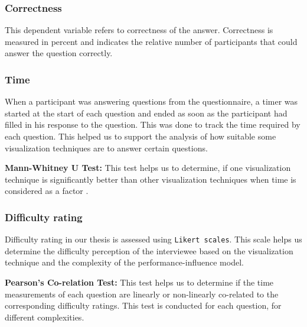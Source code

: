 \subsubsection*{Correctness}
This dependent variable refers to correctness of the answer. Correctness is measured in percent and indicates the relative number of participants that could answer the question correctly. 

\subsubsection*{Time}
When a participant was answering questions from the questionnaire, a timer was started at the start of each question and ended as soon as the participant had filled in his response to the question. This was done to track the time required by each question.
This helped us to support the analysis of how suitable some visualization techniques are to answer certain questions.

\begin{myindentpar}{0.5cm}
  \textbf{Mann-Whitney U Test:} This test helps us to determine, if one visualization technique is significantly better than other visualization techniques when time is considered as a factor \cite{DBLP:conf/eusflat/GrzegorzewskiS17}.
\end{myindentpar}

\subsubsection*{Difficulty rating}
Difficulty rating in our thesis is assessed using \texttt{Likert scales}. This scale helps us determine the difficulty perception of the interviewee based on the visualization technique and the complexity of the performance-influence model.

\begin{myindentpar}{0.5cm}
  \textbf{Pearson's Co-relation Test:} This test helps us to determine if the time measurements of each question are linearly or non-linearly co-related to the corresponding difficulty ratings. This test is conducted for each question, for different complexities.
\end{myindentpar}







 